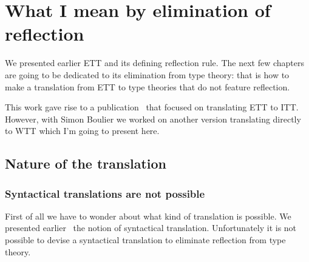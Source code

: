 \chapter{What I mean by elimination of reflection}

We presented earlier \acrshort{ETT} and its defining reflection rule.
%
%
The next few chapters are going to be dedicated to its elimination from type
theory: that is how to make a translation from \acrshort{ETT} to type theories
that do not feature reflection.

This work gave rise to a publication~ that
focused on translating \acrshort{ETT} to \acrshort{ITT}.
However, with Simon Boulier we worked on another version translating directly to
\acrshort{WTT} which I'm going to present here.

\section{Nature of the translation}


\subsection{Syntactical translations are not possible}

First of all we have to wonder about what kind of translation is possible.
We presented earlier~\misref{} the notion of syntactical translation.
Unfortunately it is not possible to devise a syntactical translation to
eliminate reflection from type theory.


